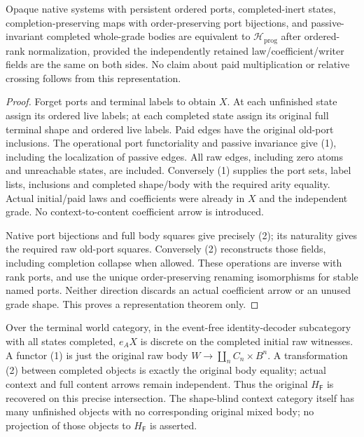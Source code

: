 \documentclass[11pt]{article}\usepackage{amsmath,amssymb,amsthm,geometry}\geometry{margin=1in}
\begin{document}
\begin{lemma}
Opaque native systems with persistent ordered ports, completed-inert states, completion-preserving maps with order-preserving port bijections, and passive-invariant completed whole-grade bodies are equivalent to $\mathcal H_{\mathrm{prog}}$ after ordered-rank normalization, provided the independently retained law/coefficient/writer fields are the same on both sides. No claim about paid multiplication or relative crossing follows from this representation.
\end{lemma}
\begin{proof}
Forget ports and terminal labels to obtain $X$. At each unfinished state assign its ordered live labels; at each completed state assign its original full terminal shape and ordered live labels. Paid edges have the original old-port inclusions. The operational port functoriality and passive invariance give (1), including the localization of passive edges. All raw edges, including zero atoms and unreachable states, are included. Conversely (1) supplies the port sets, label lists, inclusions and completed shape/body with the required arity equality. Actual initial/paid laws and coefficients were already in $X$ and the independent grade. No context-to-content coefficient arrow is introduced.

Native port bijections and full body squares give precisely (2); its naturality gives the required raw old-port squares. Conversely (2) reconstructs those fields, including completion collapse when allowed. These operations are inverse with rank ports, and use the unique order-preserving renaming isomorphisms for stable named ports. Neither direction discards an actual coefficient arrow or an unused grade shape. This proves a representation theorem only.\end{proof}

Over the terminal world category, in the event-free identity-decoder subcategory with all states completed, $e_AX$ is discrete on the completed initial raw witnesses. A functor (1) is just the original raw body $W\to\coprod_n C_n\times B^n$. A transformation (2) between completed objects is exactly the original body equality; actual context and full content arrows remain independent. Thus the original $H_{\mathsf F}$ is recovered on this precise intersection. The shape-blind context category itself has many unfinished objects with no corresponding original mixed body; no projection of those objects to $H_{\mathsf F}$ is asserted.
\end{document}
